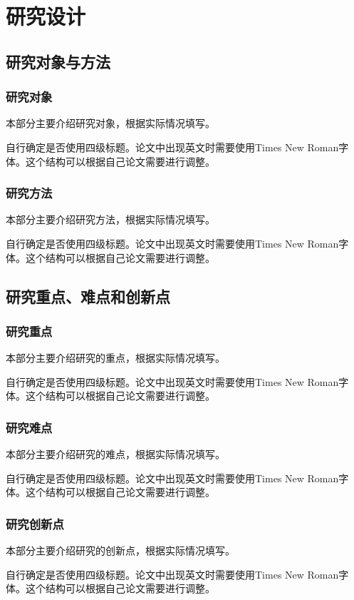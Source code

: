 \chapter{研究设计}

\section{研究对象与方法}
\subsection{研究对象}
本部分主要介绍研究对象，根据实际情况填写。

自行确定是否使用四级标题。论文中出现英文时需要使用Times New Roman字体。这个结构可以根据自己论文需要进行调整。
\subsection{研究方法 }
本部分主要介绍研究方法，根据实际情况填写。

自行确定是否使用四级标题。论文中出现英文时需要使用Times New Roman字体。这个结构可以根据自己论文需要进行调整。
\section{研究重点、难点和创新点}
\subsection{研究重点} 
本部分主要介绍研究的重点，根据实际情况填写。

自行确定是否使用四级标题。论文中出现英文时需要使用Times New Roman字体。这个结构可以根据自己论文需要进行调整。
\subsection{研究难点} 
本部分主要介绍研究的难点，根据实际情况填写。

自行确定是否使用四级标题。论文中出现英文时需要使用Times New Roman字体。这个结构可以根据自己论文需要进行调整。
\subsection{研究创新点}
本部分主要介绍研究的创新点，根据实际情况填写。

自行确定是否使用四级标题。论文中出现英文时需要使用Times New Roman字体。这个结构可以根据自己论文需要进行调整。
